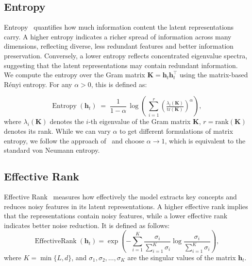 \documentclass{article} %
\begin{document}
\subsection{Entropy}
Entropy~\citep{skean2025layer} quantifies how much information content the latent representations carry. A higher entropy indicates a richer spread of information across many dimensions, reflecting diverse, less redundant features and better information preservation. Conversely, a lower entropy reflects concentrated eigenvalue spectra, suggesting that the latent representations may contain redundant information. We compute the entropy over the Gram matrix $\mathbf{K} = \mathbf{h}_t \mathbf{h}_t^\top$ using the matrix-based R\'enyi entropy. For any $\alpha > 0$, this is defined as:

\begin{equation}
\label{eq:matrix-based-entropy}
    \operatorname{Entropy}(\mathbf{h}_t) \;=\; \frac{1}{1-\alpha} \,\log \left(\,\sum_{i=1}^{r}\left(\tfrac{\lambda_i(\mathbf{K})}{\mathrm{tr}(\mathbf{K})}\right)^\alpha\right),
\end{equation}
where $\lambda_i(\mathbf{K})$ denotes the $i$-th eigenvalue of the Gram matrix $\mathbf{K}$, $r=\text{rank}(\mathbf{K})$ denotes its rank. While we can vary $\alpha$ to get different formulations of matrix entropy, we follow the approach of~\citet{skean2025layer} and choose $\alpha{\rightarrow}1$, which is equivalent to the standard von Neumann entropy.


\subsection{Effective Rank}
Effective Rank~\citep{wei2024DiffeRank} measures how effectively the model extracts key concepts and reduces noisy features in its latent representations. A higher effective rank implies that the representations contain noisy features, while a lower effective rank indicates better noise reduction. It is defined as follows:
\begin{equation} 
\operatorname{EffectiveRank}(\mathbf{h}_t) = \exp{\left( - \sum^K_{i=1} \frac{\sigma_i}{\sum^K_{i=1} \sigma_i}  \log \frac{\sigma_i}{\sum^K_{i=1} \sigma_i} \right)},
\end{equation}
where $K = \min \{ L, d \}$, and $\sigma_1,\sigma_2, \dots,  \sigma_{K}$ are the singular values of the matrix $\mathbf{h}_t$.

\end{document}
